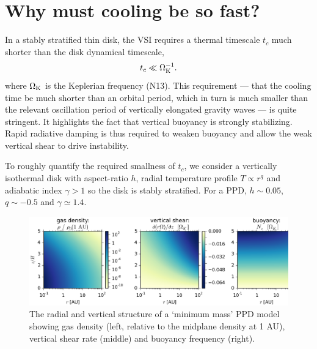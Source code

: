 \documentclass[iop, numberedappendix]{emulateapj}
\def \OmK {\Omega_{\rm K}}
\begin{document}
\section{Why must cooling be so fast?}\label{vsi_require}     
In a stably stratified thin disk, the VSI  
requires a thermal timescale $t_c$ much shorter than the
disk dynamical timescale, 
\begin{align}
  t _c \ll \OmK^{-1}. 
\end{align}
where $\OmK$ is the Keplerian frequency (N13).    
This requirement --- that the cooling time be much shorter than an orbital period, 
which in turn is much smaller than the relevant oscillation period of vertically elongated gravity waves  --- is quite stringent.
It highlights the fact that vertical buoyancy is strongly 
stabilizing. Rapid radiative damping is thus required to weaken
buoyancy and allow the weak vertical shear to drive instability.   

To roughly quantify the required smallness of $t_c$, we consider a
vertically isothermal disk with aspect-ratio $ h$, 
 radial temperature profile $T \propto r^q$ and adiabatic index
$\gamma>1$ so the disk is stably stratified.  For a PPD, $ h \sim 0.05$,
$q\sim -0.5$ and $\gamma\simeq 1.4$.  

\begin{figure}
  \includegraphics[width=\linewidth]{figures/rhoshearNz}
  \caption{The radial and vertical structure of a `minimum mass' PPD model showing gas density (left, relative to the midplane density at 1 AU), vertical shear rate (middle) and
    buoyancy frequency (right).
    \label{eqm_structure} 
  }
\end{figure}
\end{document}
